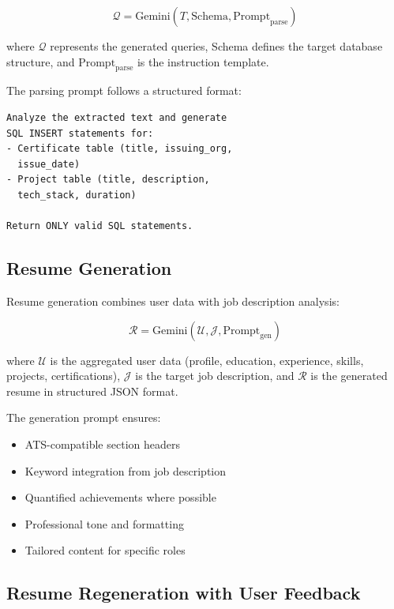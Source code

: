 \documentclass[conference]{IEEEtran}
\begin{document}
\begin{equation}
\mathcal{Q} = \text{Gemini}(T, \text{Schema}, \text{Prompt}_{\text{parse}})
\label{eq:parsing}
\end{equation}

where $\mathcal{Q}$ represents the generated queries, Schema defines the target database structure, and $\text{Prompt}_{\text{parse}}$ is the instruction template.

The parsing prompt follows a structured format:

\begin{lstlisting}[basicstyle=\small\ttfamily, breaklines=true]
Analyze the extracted text and generate 
SQL INSERT statements for:
- Certificate table (title, issuing_org, 
  issue_date)
- Project table (title, description, 
  tech_stack, duration)
  
Return ONLY valid SQL statements.
\end{lstlisting}

\subsection{Resume Generation}

Resume generation combines user data with job description analysis:

\begin{equation}
\mathcal{R} = \text{Gemini}(\mathcal{U}, \mathcal{J}, \text{Prompt}_{\text{gen}})
\label{eq:generation}
\end{equation}

where $\mathcal{U}$ is the aggregated user data (profile, education, experience, skills, projects, certifications), $\mathcal{J}$ is the target job description, and $\mathcal{R}$ is the generated resume in structured JSON format.

The generation prompt ensures:
\begin{itemize}
    \item ATS-compatible section headers
    \item Keyword integration from job description
    \item Quantified achievements where possible
    \item Professional tone and formatting
    \item Tailored content for specific roles
\end{itemize}

\subsection{Resume Regeneration with User Feedback}
\end{document}
